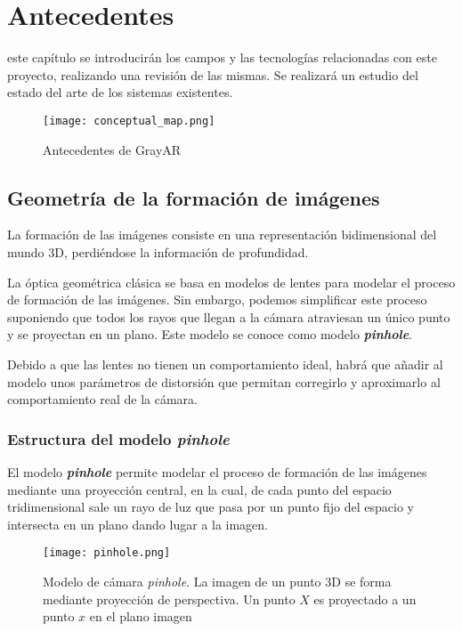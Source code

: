 \chapter{Antecedentes}
\label{chap:antecedentes}

 este capítulo se introducirán los campos y las tecnologías relacionadas con este
proyecto, realizando una revisión de las mismas. Se realizará un estudio del estado del
arte de los sistemas existentes.

\begin{figure}[h!] 
  \centering
  \texttt{[image: conceptual\_map.png]}
  \caption{Antecedentes de GrayAR}
  \label{fig:antecedentes}
\end{figure}


\section{Geometría de la formación de imágenes}
La formación de las imágenes consiste en una representación bidimensional del mundo 3D, perdiéndose la información de profundidad.

La óptica geométrica clásica se basa en modelos de lentes para modelar el proceso de formación de las imágenes. Sin embargo, podemos simplificar este proceso suponiendo que todos los rayos que llegan a la cámara atraviesan un único punto y se proyectan en un plano. Este modelo se conoce como modelo \textbf{\textit{pinhole}}.

Debido a que las lentes no tienen un comportamiento ideal, habrá que añadir al modelo unos parámetros de distorsión que permitan corregirlo y aproximarlo al comportamiento real de la cámara.

\subsection{Estructura del modelo \textit{pinhole}}
El modelo \textbf{\textit{pinhole}} \cite{Hartley} permite modelar el proceso de formación de las imágenes mediante una proyección central, en la cual, de cada punto del espacio tridimensional sale un rayo de luz que pasa por un punto fijo del espacio y intersecta en un plano dando lugar a la imagen.

\begin{figure}[h]
  \centering
  \texttt{[image: pinhole.png]}
  \caption{Modelo de cámara \textit{pinhole}. La imagen de un punto 3D se forma mediante proyección de perspectiva. Un punto $X$ es proyectado a un punto $x$ en el plano imagen}
  \label{fig:pinholeCamera}
\end{figure}

